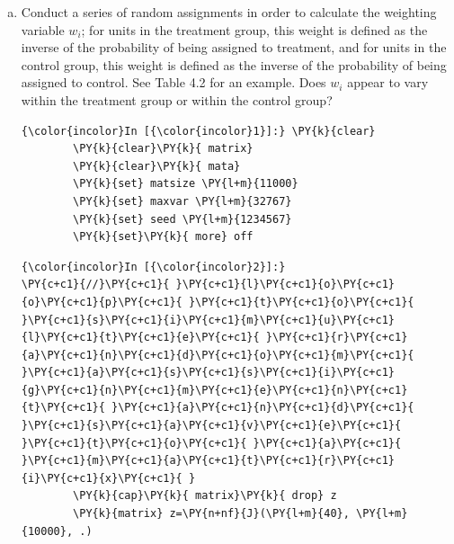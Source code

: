 \documentclass[11pt,notitlepage]{article}\usepackage[]{graphicx}\usepackage[]{color}
\makeatletter
\newenvironment{kframe}{%
 \def\at@end@of@kframe{}%
 \ifinner\ifhmode%
  \def\at@end@of@kframe{\end{minipage}}%
  \begin{minipage}{\columnwidth}%
 \fi\fi%
 \def\FrameCommand##1{\hskip\@totalleftmargin \hskip-\fboxsep
 \colorbox{shadecolor}{##1}\hskip-\fboxsep
     \hskip-\linewidth \hskip-\@totalleftmargin \hskip\columnwidth}%
 \MakeFramed {\advance\hsize-\width
   \@totalleftmargin\z@ \linewidth\hsize
   \@setminipage}}%
 {\par\unskip\endMakeFramed%
 \at@end@of@kframe}
\newenvironment{knitrout}{}{} %
\makeatother
\begin{document}
\begin{enumerate}[a)]
\item Conduct a series of random assignments in order to calculate the weighting variable $w_i$; for units in the treatment group, this weight is defined as the inverse of the probability of being assigned to treatment, and for units in the control group, this weight is defined as the inverse of the probability of being assigned to control. See Table 4.2 for an example. Does $w_i$ appear to vary within the treatment group or within the control group?

\begin{knitrout}
\color{fgcolor}\begin{kframe}
    \begin{Verbatim}[commandchars=\\\{\}]
{\color{incolor}In [{\color{incolor}1}]:} \PY{k}{clear}
        \PY{k}{clear}\PY{k}{ matrix}
        \PY{k}{clear}\PY{k}{ mata}
        \PY{k}{set} matsize \PY{l+m}{11000} 
        \PY{k}{set} maxvar \PY{l+m}{32767}
        \PY{k}{set} seed \PY{l+m}{1234567}
        \PY{k}{set}\PY{k}{ more} off
\end{Verbatim}

    \begin{Verbatim}[commandchars=\\\{\}]
{\color{incolor}In [{\color{incolor}2}]:} 
\PY{c+c1}{//}\PY{c+c1}{ }\PY{c+c1}{l}\PY{c+c1}{o}\PY{c+c1}{o}\PY{c+c1}{p}\PY{c+c1}{ }\PY{c+c1}{t}\PY{c+c1}{o}\PY{c+c1}{ }\PY{c+c1}{s}\PY{c+c1}{i}\PY{c+c1}{m}\PY{c+c1}{u}\PY{c+c1}{l}\PY{c+c1}{t}\PY{c+c1}{e}\PY{c+c1}{ }\PY{c+c1}{r}\PY{c+c1}{a}\PY{c+c1}{n}\PY{c+c1}{d}\PY{c+c1}{o}\PY{c+c1}{m}\PY{c+c1}{ }\PY{c+c1}{a}\PY{c+c1}{s}\PY{c+c1}{s}\PY{c+c1}{i}\PY{c+c1}{g}\PY{c+c1}{n}\PY{c+c1}{m}\PY{c+c1}{e}\PY{c+c1}{n}\PY{c+c1}{t}\PY{c+c1}{ }\PY{c+c1}{a}\PY{c+c1}{n}\PY{c+c1}{d}\PY{c+c1}{ }\PY{c+c1}{s}\PY{c+c1}{a}\PY{c+c1}{v}\PY{c+c1}{e}\PY{c+c1}{ }\PY{c+c1}{t}\PY{c+c1}{o}\PY{c+c1}{ }\PY{c+c1}{a}\PY{c+c1}{ }\PY{c+c1}{m}\PY{c+c1}{a}\PY{c+c1}{t}\PY{c+c1}{r}\PY{c+c1}{i}\PY{c+c1}{x}\PY{c+c1}{ }       
        \PY{k}{cap}\PY{k}{ matrix}\PY{k}{ drop} z
        \PY{k}{matrix} z=\PY{n+nf}{J}(\PY{l+m}{40}, \PY{l+m}{10000}, .)
        

\end{Verbatim}
\end{kframe}
\end{knitrout}
\end{enumerate}
\end{document}
